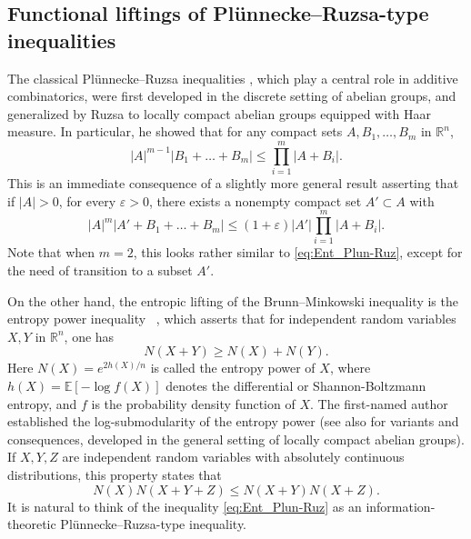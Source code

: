 \documentclass[11pt]{amsart}
\newcommand{\R}{{\mathbb R}}
\theoremstyle{plain}
\theoremstyle{definition}
\theoremstyle{remark}
\begin{document}
\subsection{Functional liftings of Pl\"unnecke--Ruzsa-type inequalities}

The classical Pl\"unnecke--Ruzsa inequalities \cite{P-70, R-89, TV-06}, which  play a central role in additive combinatorics, were first developed in the discrete setting of abelian groups, and generalized by Ruzsa \cite{R-96} to locally compact abelian groups equipped with Haar measure. In particular, he showed that for any compact sets $A,B_1, \ldots ,B_m$ in ${\mathbb R}^n$,
\begin{equation}\label{eq:ruzvol1}
|A|^{m-1}|B_1+\ldots +B_m| \le \prod_{i=1}^m|A + B_i|.
\end{equation}
This is an immediate consequence of a slightly more general result asserting that if $|A|>0$, for every $\varepsilon >0$, there exists a nonempty compact set $A' \subset A $ with
 \begin{equation}\label{eq:ruzvol}
 |A|^m|A'+B_1+\ldots +B_m| \le (1+\varepsilon)|A'| \prod_{i=1}^m|A + B_i|.
 \end{equation}
Note that when $m=2$, this looks rather similar to
\eqref{eq:Ent_Plun-Ruz}, except for the need of transition to a subset $A'$.

On the other hand, the entropic lifting of the Brunn--Minkowski inequality is the entropy power inequality ~\cite{S-48,S-59}, which asserts that for independent random variables $X,Y$ in $\R^n$, one has
\begin{equation}
    \label{eq:EPI}
    N(X+Y) \geq N(X)+N(Y) .
\end{equation}
Here $N(X) = e^{2 h(X) / n}$ is called the entropy power of $X$,  where $h(X) = \mathbb{E} [ -\log f(X)]$ denotes the differential or Shannon-Boltzmann entropy, and $f$ is the probability density function of $X$.
The first-named author established the log-submodularity of the entropy power \cite{M-08} (see also \cite{MK-18} for variants and consequences, developed in the general setting of locally compact abelian groups). If $X,Y,Z$ are independent random variables with absolutely continuous distributions, this property states that
\begin{equation}
    \label{eq:Ent_Plun-Ruz}
    N(X)N(X+Y+Z) \leq N(X+Y)N(X+Z).
\end{equation}
It is natural to think of the inequality \eqref{eq:Ent_Plun-Ruz} as an information-theoretic Pl\"unnecke--Ruzsa-type inequality.
\end{document}
